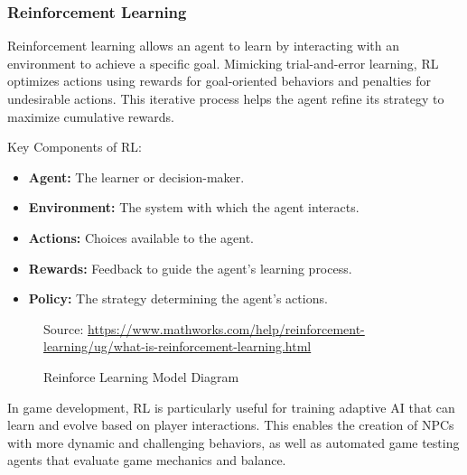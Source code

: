 \documentclass[12pt,oneside,openright,a4paper]{cpe-english-project}
\begin{document}
\subsubsection{Reinforcement Learning}
Reinforcement learning allows an agent to learn by interacting with an environment to achieve a specific goal. Mimicking trial-and-error learning, RL optimizes actions using rewards for goal-oriented behaviors and penalties for undesirable actions. This iterative process helps the agent refine its strategy to maximize cumulative rewards.

Key Components of RL:
\begin{itemize}
\item  \textbf{Agent:} The learner or decision-maker.
\item  \textbf{Environment:} The system with which the agent interacts.
\item  \textbf{Actions:} Choices available to the agent.
\item  \textbf{Rewards:} Feedback to guide the agent's learning process.
\item  \textbf{Policy:} The strategy determining the agent's actions.
\end{itemize}
\begin{figure}[!h]
\centering
{}
\caption{Reinforce Learning Model Diagram}\label{fig:ReinforceModelDia}
Source:
\href{https://www.mathworks.com/help/reinforcement-learning/ug/what-is-reinforcement-learning.html} {https://www.mathworks.com/help/reinforcement-learning/ug/what-is-reinforcement-learning.html}
\end{figure}
In game development, RL is particularly useful for training adaptive AI that can learn and evolve based on player interactions. This enables the creation of NPCs with more dynamic and challenging behaviors, as well as automated game testing agents that evaluate game mechanics and balance.
\end{document}
